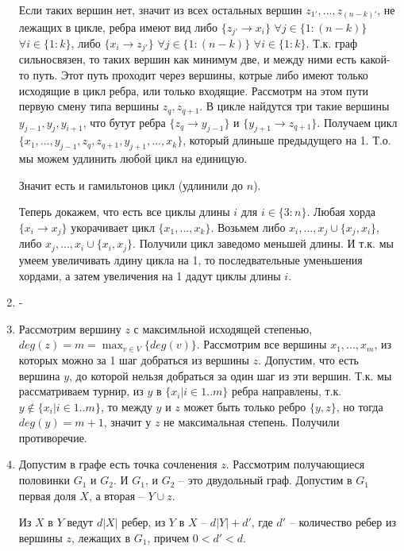 \documentclass{article}
\begin{document}
\begin{enumerate}
Если таких вершин нет,
значит из всех остальных вершин $z_{1'},...,z_{(n-k)'}$, не лежащих в
цикле,
ребра имеют вид либо $\{z_{j'} \to x_{i}\}$ $\forall j \in
\{1:(n-k)\}$ $\forall i \in \{1:k\}$, либо $\{x_{i} \to z_{j'}\}$ $\forall j \in
\{1:(n-k)\}$ $\forall i \in \{1:k\}$. Т.к. граф сильносвязен,
то таких вершин как минимум две, и между ними есть какой-то путь. Этот
путь проходит через вершины, котрые либо имеют только исходящие в цикл
ребра, или только входящие. Рассмотрм на этом пути первую смену типа
вершины $z_{q}, z_{q+1}$. В цикле найдутся три такие вершины $y_{j-1},
y_{j}, y_{i+1}$, что бутут ребра $\{z_{q} \to y_{j-1}\}$ и $\{y_{j+1}
\to z_{q+1}\}$. Получаем цикл
$\{x_{1},...,y_{j-1},z_{q},z_{q+1},y_{j+1},...,x_{k}\}$, который
длиньше предыдущего на 1. Т.о. мы можем удлинить любой цикл на
единицую.

Значит есть и гамильтонов цикл (удлинили до $n$).


Теперь докажем, что есть все циклы длины $i$ для $i \in
\{3:n\}$. Любая хорда $\{x_{i} \to x_{j}\}$ укорачивает
цикл $\{x_{1},...,x_{k}\}$. Возьмем либо $x_{i},...,x_{j} \cup
\{x_{j}, x_{i}\}$, либо $x_{j},...,x_{i} \cup
\{x_{i}, x_{j}\}$. Получили цикл заведомо меньшей длины. И т.к. мы
умеем увеличивать лдину цикла на 1, то последвательные уменьшения
хордами, а затем увеличения на 1 дадут циклы длины $i$.

\item -

\item

Рассмотрим вершину $z$ с максимльной исходящей степенью, $deg(z) = m =
\max_{v \in V}\{deg(v)\}$. Рассмотрим все вершины $x_{1},...,x_{m}$, из которых можно за 1 шаг добраться из
вершины $z$. Допустим, что есть вершина $y$, до которой нельзя добраться
за один шаг из эти вершин. Т.к. мы рассматриваем турнир, из $y$ в
$\{x_i | i \in 1..m\}$
ребра направлены, т.к. $y \notin \{x_i | i \in 1..m\}$, то между $y$ и $z$ может
быть только ребро $\{y, z\}$, но тогда $deg(y) = m + 1$, значит у $z$
не максимальная степень. Получили противоречие.

\item

Допустим в графе есть точка сочленения $z$. Рассмотрим получающиеся
половинки $G_1$ и $G_2$. И $G_1$, и $G_2$ -- это двудольный
граф. Допустим в $G_1$ первая доля $X$, а вторая -- $Y \cup z$.

Из $X$ в $Y$ ведут $d|X|$ ребер, из $Y$ в $X$ -- $d|Y| + d'$,
где $d'$ -- количество ребер из вершины $z$, лежащих в $G_1$,
причем $0 < d' < d$.


\end{enumerate}
\end{document}
